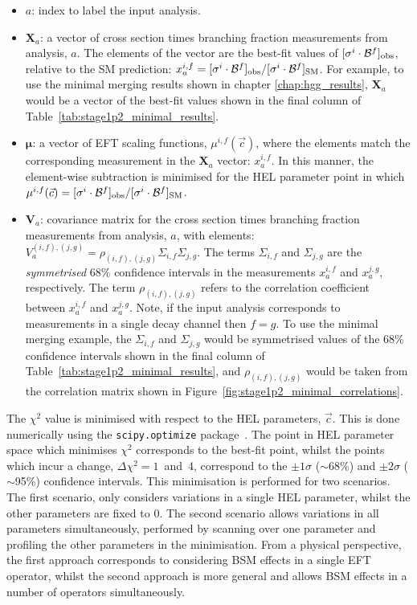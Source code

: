\begin{itemize}
    \item $a$: index to label the input analysis.
    \item $\mathbf{X}_a$: a vector of cross section times branching fraction measurements from analysis, $a$. The elements of the vector are the best-fit values of $[\sigma^i\cdot\mathcal{B}^f]_{\rm{obs}}$, relative to the SM prediction: $x^{i,f}_a=[\sigma^i\cdot\mathcal{B}^f]_{\rm{obs}}/[\sigma^i\cdot\mathcal{B}^f]_{\rm{SM}}$. For example, to use the \Hgg minimal merging results shown in chapter \ref{chap:hgg_results}, $\mathbf{X}_a$ would be a vector of the best-fit values shown in the final column of Table~\ref{tab:stage1p2_minimal_results}.
    \item $\pmb{\mu}$: a vector of EFT scaling functions, $\mu^{i,f}(\vec{c})$, where the elements match the corresponding measurement in the $\mathbf{X}_a$ vector: $x^{i,f}_a$. In this manner, the element-wise subtraction is minimised for the HEL parameter point in which $\mu^{i,f}(\vec{c})=[\sigma^i\cdot\mathcal{B}^f]_{\rm{obs}}/[\sigma^i\cdot\mathcal{B}^f]_{\rm{SM}}$.
    \item $\mathbf{V}_a$: covariance matrix for the cross section times branching fraction measurements from analysis, $a$, with elements: $V^{(i,f),(j,g)}_a = \rho_{(i,f),(j,g)}\Sigma_{i,f}\Sigma_{j,g}$. The terms $\Sigma_{i,f}$ and $\Sigma_{j,g}$ are the \textit{symmetrised} 68\% confidence intervals in the measurements $x^{i,f}_a$ and $x^{j,g}_a$, respectively. The term $\rho_{(i,f),(j,g)}$ refers to the correlation coefficient between $x^{i,f}_a$ and $x^{j,g}_a$. Note, if the input analysis corresponds to measurements in a single decay channel then $f=g$. To use the \Hgg minimal merging example, the $\Sigma_{i,f}$ and $\Sigma_{j,g}$ would be symmetrised values of the 68\% confidence intervals shown in the final column of Table~\ref{tab:stage1p2_minimal_results}, and $\rho_{(i,f),(j,g)}$ would be taken from the correlation matrix shown in Figure~\ref{fig:stage1p2_minimal_correlations}.
\end{itemize}

The $\chi^2$ value is minimised with respect to the HEL parameters, $\vec{c}$. This is done numerically using the \texttt{scipy.optimize} package~\cite{}. The point in HEL parameter space which minimises $\chi^2$ corresponds to the best-fit point, whilst the points which incur a change, $\Delta\chi^2=1$~and~4, correspond to the $\pm1\sigma$ ($\sim$68\%) and $\pm2\sigma$ ($\sim$95\%) confidence intervals. This minimisation is performed for two scenarios. The first scenario, only considers variations in a single HEL parameter, whilst the other parameters are fixed to 0. The second scenario allows variations in all parameters simultaneously, performed by scanning over one parameter and profiling the other parameters in the minimisation. From a physical perspective, the first approach corresponds to considering BSM effects in a single EFT operator, whilst the second approach is more general and allows BSM effects in a number of operators simultaneously.

